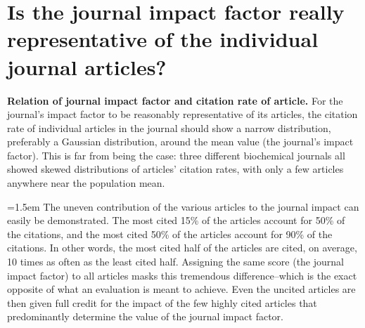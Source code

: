 \documentclass[11pt, a4paper]{article}
\renewcommand{\emph}[1]{\textbf{#1}}
\begin{document}
\section{Is the journal impact factor really representative of the individual journal articles?}
    
\parindent=0pt \parskip=10pt
\emph{Relation of journal impact factor and citation rate of article.}
For the journal's impact factor to be reasonably representative of its articles,
the citation rate of individual articles in the journal should show a narrow distribution,
preferably a Gaussian distribution, around the mean value (the journal's impact factor).
This is far from being the case: three different biochemical journals all showed skewed
distributions of articles' citation rates, with only a few articles anywhere near the population mean.

\parindent=1.5em \parskip=0pt
The uneven contribution of the various articles to the journal impact can easily be demonstrated.
The most cited 15\% of the articles account for 50\% of the citations, and the most cited 50\%
of the articles account for 90\% of the citations. In other words, the most cited half of
the articles are cited, on average, 10 times as often as the least cited half.
Assigning the same score (the journal impact factor) to all articles masks this
tremendous difference–which is the exact opposite of what an evaluation is meant to achieve.
Even the uncited articles are then given full credit for the impact of the few highly
cited articles that predominantly determine the value of the journal impact factor.
\end{document}
